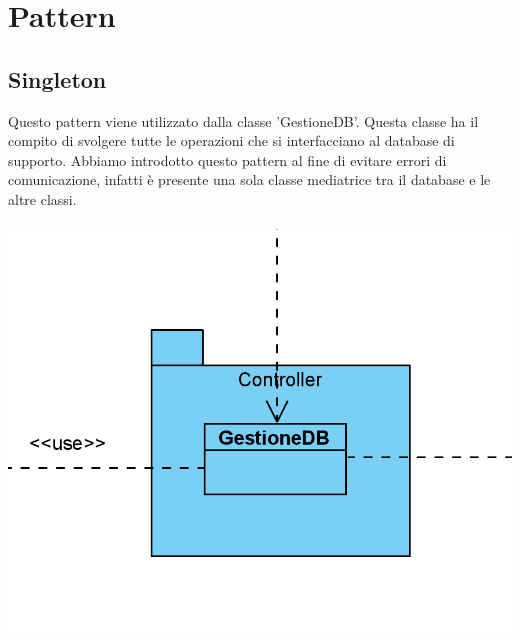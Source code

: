 \documentclass[a4paper, titlepage]{article}
\begin{document}
\section{Pattern}
\vphantom{}
\subsection{Singleton}
Questo pattern viene utilizzato dalla classe 'GestioneDB'. Questa classe ha il compito di svolgere tutte le operazioni che si interfacciano al database di supporto. Abbiamo introdotto questo pattern al fine di evitare errori di comunicazione, infatti è presente una sola classe mediatrice tra il database e le altre classi.\\\\
\includegraphics[scale=0.80]{Immagini/Singleton.png}
\end{document}
